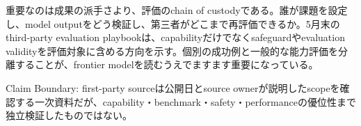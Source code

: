 重要なのは成果の派手さより、評価のchain of custodyである。誰が課題を設定し、model outputをどう検証し、第三者がどこまで再評価できるか。5月末のthird-party evaluation playbookは、capabilityだけでなくsafeguardやevaluation validityを評価対象に含める方向を示す。個別の成功例と一般的な能力評価を分離することが、frontier modelを読むうえでますます重要になっている。\autocite{src-1c93d6c1c725,src-8c84b8422093}


\begin{claimboundary}
Claim Boundary: first-party sourceは公開日とsource ownerが説明したscopeを確認する一次資料だが、capability・benchmark・safety・performanceの優位性まで独立検証したものではない。\autocite{src-1c93d6c1c725,src-8c84b8422093}
\end{claimboundary}
